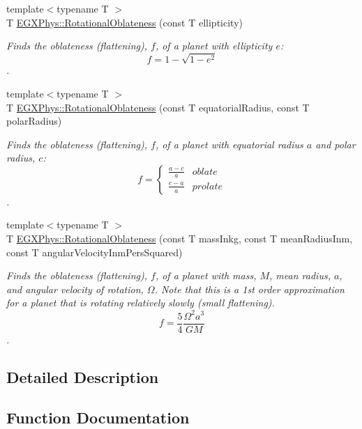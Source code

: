 \begin{DoxyCompactItemize}
{\footnotesize template$<$typename T $>$ }\\T \mbox{\hyperlink{group___e_g_x_phys-_astrophysics-_rotational_flattening_ga36ebeca0d4a23d1f58ffc28b40c749c3}{E\+G\+X\+Phys\+::\+Rotational\+Oblateness}} (const T ellipticity)
\begin{DoxyCompactList}\small\item\em Finds the oblateness (flattening), $f$, of a planet with ellipticity $e$\+: \[ f = 1 - \sqrt{1-e^2} \]. \end{DoxyCompactList}\item 
{\footnotesize template$<$typename T $>$ }\\T \mbox{\hyperlink{group___e_g_x_phys-_astrophysics-_rotational_flattening_ga0bbe606845430e58be5ed34541835f83}{E\+G\+X\+Phys\+::\+Rotational\+Oblateness}} (const T equatorial\+Radius, const T polar\+Radius)
\begin{DoxyCompactList}\small\item\em Finds the oblateness (flattening), $f$, of a planet with equatorial radius $a$ and polar radius, $c$\+: \[ f =\begin{cases} \frac{a-c}{a}{} & oblate \\ \frac{c-a}{a} & prolate \end{cases} \]. \end{DoxyCompactList}\item 
{\footnotesize template$<$typename T $>$ }\\T \mbox{\hyperlink{group___e_g_x_phys-_astrophysics-_rotational_flattening_ga7d78d01c8b3e1a9b2e4f17cb67969a88}{E\+G\+X\+Phys\+::\+Rotational\+Oblateness}} (const T mass\+Inkg, const T mean\+Radius\+Inm, const T angular\+Velocity\+Inm\+Pers\+Squared)
\begin{DoxyCompactList}\small\item\em Finds the oblateness (flattening), $f$, of a planet with mass, $M$, mean radius, $a$, and angular velocity of rotation, $\Omega$. Note that this is a 1st order approximation for a planet that is rotating relatively slowly (small flattening). \[ f = \frac{5}{4} \frac{\Omega^2 a^3}{GM} \]. \end{DoxyCompactList}\end{DoxyCompactItemize}


\subsection{Detailed Description}


\subsection{Function Documentation}
\mbox{\label{group___e_g_x_phys-_astrophysics-_rotational_flattening_gaa89a23906fe0f4df85463f301825b466}} 
